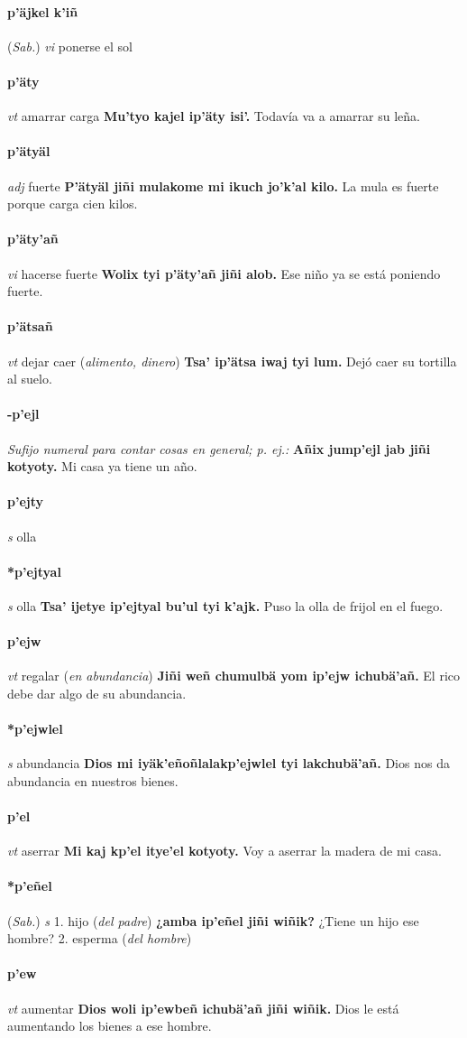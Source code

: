 \documentclass{scrbook}
\newcommand{\entry}[1]{\paragraph{#1}}
\newcommand{\onedefinition}[1]{#1.}
\newcommand{\nontranslationdef}[1]{\textit{#1}}
\newcommand{\partofspeech}[1]{\textit{#1}}
\newcommand{\spanishtranslation}[1]{#1}
\newcommand{\clarification}[1]{(\textit{#1})}
\newcommand{\cholexample}[1]{\textbf{#1}}
\newcommand{\exampletranslation}[1]{#1}
\newcommand{\relevantdialect}[1]{(\textit{#1})}
\begin{document}
\begin{multicols}{2}
\entry{p'äjkel k'iñ}
\relevantdialect{Sab.}
\partofspeech{vi}
\spanishtranslation{ponerse el sol}

\entry{p'äty}
\partofspeech{vt}
\spanishtranslation{amarrar carga}
\cholexample{Mu'tyo kajel ip'äty isi'.}
\exampletranslation{Todavía va a amarrar su leña.}

\entry{p'ätyäl}
\partofspeech{adj}
\spanishtranslation{fuerte}
\cholexample{P'ätyäl jiñi mulakome mi ikuch jo'k'al kilo.}
\exampletranslation{La mula es fuerte porque carga cien kilos.}

\entry{p'äty'añ}
\partofspeech{vi}
\spanishtranslation{hacerse fuerte}
\cholexample{Wolix tyi p'äty'añ jiñi alob.}
\exampletranslation{Ese niño ya se está poniendo fuerte.}

\entry{p'ätsañ}
\partofspeech{vt}
\spanishtranslation{dejar caer}
\clarification{alimento, dinero}
\cholexample{Tsa' ip'ätsa iwaj tyi lum.}
\exampletranslation{Dejó caer su tortilla al suelo.}

\entry{-p'ejl}
\nontranslationdef{Sufijo numeral para contar cosas en general; p. ej.:}
\cholexample{Añix jump'ejl jab jiñi kotyoty.}
\exampletranslation{Mi casa ya tiene un año.}

\entry{p'ejty}
\partofspeech{s}
\spanishtranslation{olla}

\entry{*p'ejtyal}
\partofspeech{s}
\spanishtranslation{olla}
\cholexample{Tsa' ijetye ip'ejtyal bu'ul tyi k'ajk.}
\exampletranslation{Puso la olla de frijol en el fuego.}

\entry{p'ejw}
\partofspeech{vt}
\spanishtranslation{regalar}
\clarification{en abundancia}
\cholexample{Jiñi weñ chumulbä yom ip'ejw ichubä'añ.}
\exampletranslation{El rico debe dar algo de su abundancia.}

\entry{*p'ejwlel}
\partofspeech{s}
\spanishtranslation{abundancia}
\cholexample{Dios mi iyäk'eñoñlalakp'ejwlel tyi lakchubä'añ.}
\exampletranslation{Dios nos da abundancia en nuestros bienes.}

\entry{p'el}
\partofspeech{vt}
\spanishtranslation{aserrar}
\cholexample{Mi kaj kp'el itye'el kotyoty.}
\exampletranslation{Voy a aserrar la madera de mi casa.}

\entry{*p'eñel}
\relevantdialect{Sab.}
\partofspeech{s}
\onedefinition{1}
\spanishtranslation{hijo}
\clarification{del padre}
\cholexample{¿amba ip'eñel jiñi wiñik?}
\exampletranslation{¿Tiene un hijo ese hombre?}
\onedefinition{2}
\spanishtranslation{esperma}
\clarification{del hombre}

\entry{p'ew}
\partofspeech{vt}
\spanishtranslation{aumentar}
\cholexample{Dios woli ip'ewbeñ ichubä'añ jiñi wiñik.}
\exampletranslation{Dios le está aumentando los bienes a ese hombre.}


\end{multicols}
\end{document}

